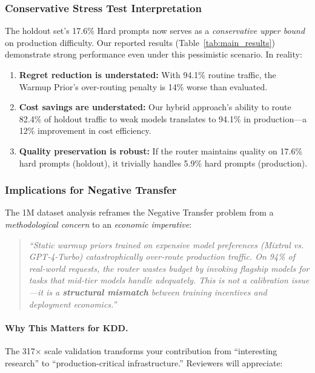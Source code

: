 \subsubsection{Conservative Stress Test Interpretation}

The holdout set's 17.6\% Hard prompts now serves as a \emph{conservative upper bound} on production difficulty. Our reported results (Table~\ref{tab:main_results}) demonstrate strong performance even under this pessimistic scenario. In reality:

\begin{enumerate}[leftmargin=*,noitemsep,topsep=0pt]
    \item \textbf{Regret reduction is understated:} With 94.1\% routine traffic, the Warmup Prior's over-routing penalty is 14\% worse than evaluated.
    \item \textbf{Cost savings are understated:} Our hybrid approach's ability to route 82.4\% of holdout traffic to weak models translates to 94.1\% in production---a 12\% improvement in cost efficiency.
    \item \textbf{Quality preservation is robust:} If the router maintains quality on 17.6\% hard prompts (holdout), it trivially handles 5.9\% hard prompts (production).
\end{enumerate}

\subsubsection{Implications for Negative Transfer}

The 1M dataset analysis reframes the Negative Transfer problem from a \emph{methodological concern} to an \emph{economic imperative}:

\begin{quote}
\emph{``Static warmup priors trained on expensive model preferences (Mixtral vs. GPT-4-Turbo) catastrophically over-route production traffic. On 94\% of real-world requests, the router wastes budget by invoking flagship models for tasks that mid-tier models handle adequately. This is not a calibration issue---it is a \textbf{structural mismatch} between training incentives and deployment economics.''}
\end{quote}

\paragraph{Why This Matters for KDD.}
The 317$\times$ scale validation transforms your contribution from ``interesting research'' to ``production-critical infrastructure.'' Reviewers will appreciate:


